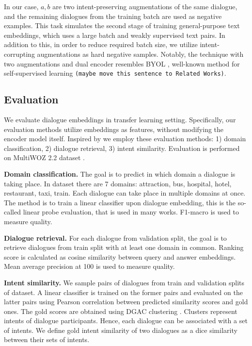 \documentclass{article}
\begin{document}
In our case, $a, b$ are two intent-preserving augmentations of the same dialogue, and the remaining dialogues from the training batch are used as negative examples. This task simulates the second stage of training general-purpose text embeddings, which uses a large batch and weakly supervised text pairs. In addition to this, in order to reduce required batch size, we utilize intent-corrupting augmentations as hard negative samples. Notably, the technique with two augmentations and dual encoder resembles BYOL \cite{grill2020bootstrap}, well-known method for self-supervised learning \texttt{(maybe move this sentence to Related Works)}.

\subsection{Evaluation}

We evaluate dialogue embeddings in transfer learning setting. Specifically, our evaluation methods utilize embeddings as features, without modifying the encoder model itself. Inspired by \cite{liu2022dial2vec} we employ these evaluation methods: 1) domain classification, 2) dialogue retrieval, 3) intent similarity. Evaluation is performed on MultiWOZ 2.2 dataset \cite{zang2020multiwoz}.

\textbf{Domain classification.} The goal is to predict in which domain a dialogue is taking place. In dataset there are 7 domains: attraction, bus, hospital, hotel, restaurant, taxi, train. Each dialogue can take place in multiple domains at once. The method is to train a linear classifier upon dialogue embedding, this is the so-called linear probe evaluation, that is used in many works. F1-macro is used to measure quality.

\textbf{Dialogue retrieval.} For each dialogue from validation split, the goal is to retrieve dialogues from train split with at least one domain in common. Ranking score is calculated as cosine similarity between query and answer embeddings. Mean average precision at 100 is used to measure quality.

\textbf{Intent similarity.} We sample pairs of dialogues from train and validation splits of dataset. A linear classifier is trained on the former pairs and evaluated on the latter pairs using Pearson correlation between predicted similarity scores and gold ones. The gold scores are obtained using DGAC clustering \cite{dgac}. Clusters represent intents of dialogue participants. Hence, each dialogue can be associated with a set of intents. We define gold intent similarity of two dialogues as a dice similarity between their sets of intents.
\end{document}
